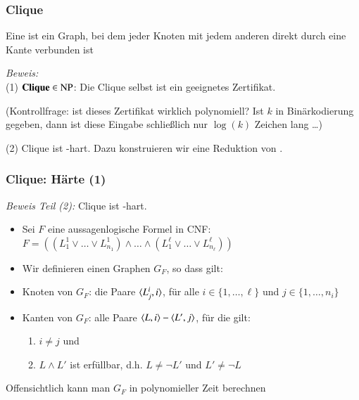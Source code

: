 \documentclass[onlymath]{beamer}
\begin{document}
\begin{frame}\frametitle{Clique}

Eine  ist ein Graph, bei dem jeder Knoten mit jedem anderen
direkt durch eine Kante verbunden ist\medskip

\medskip\pause

\pause

\emph{Beweis:}\\
(1) $\textbf{\textcolor{black}{Clique}}\in{\textsc{NP}}$: Die Clique selbst ist ein geeignetes Zertifikat.\\[1ex] {\tiny(Kontrollfrage: ist dieses Zertifikat wirklich polynomiell? Ist $k$ in Binärkodierung gegeben, dann ist diese Eingabe schließlich nur $\log(k)$ Zeichen lang \ldots)\pause

}\medskip

(2) Clique ist -hart. Dazu konstruieren wir eine Reduktion von .

\end{frame}

\begin{frame}\frametitle{Clique: Härte (1)}

\emph{Beweis Teil (2):} Clique ist -hart.
\begin{itemize}
\item Sei $F$ eine aussagenlogische Formel in CNF:\\
$F=\left((L^1_1\vee \ldots\vee L^1_{n_1})\wedge \ldots\wedge (L^\ell_1\vee \ldots\vee L^\ell_{n_\ell})\right)$\pause
%
\item Wir definieren einen Graphen $G_F$, so dass gilt:\\[1ex]
\pause
%
\item \alert{Knoten von $G_F$:} die Paare $\langle{L^i_j,i}\rangle$, für alle $i\in\{1,\ldots,\ell\}$ und $j\in\{1,\ldots,n_i\}$\pause
%
\item \alert{Kanten von $G_F$:} alle Paare $\langle{L,i}\rangle-\langle{L',j}\rangle$, für die gilt:
\begin{enumerate}[(1)]
\item $i\neq j$ und
\item $L\wedge L'$ ist erfüllbar, d.h. $L\neq \neg L'$ und $L'\neq \neg L$
\end{enumerate}
\end{itemize}
Offensichtlich kann man $G_F$ in polynomieller Zeit berechnen

\end{frame}
\end{document}
